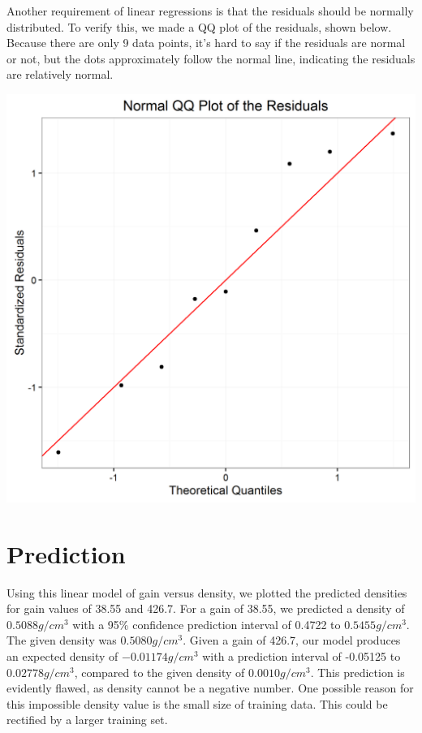 \documentclass[11pt]{article} %
\begin{document}
Another requirement of linear regressions is that the residuals should be normally distributed. To verify this, we made a QQ plot of the residuals, shown below. Because there are only 9 data points, it’s hard to say if the residuals are normal or not, but the dots approximately follow the normal line, indicating the residuals are relatively normal.
\begin{center}\includegraphics[scale=0.5]{qqPlotResiduals.png}\end{center}

\section*{Prediction}
Using this linear model of gain versus density, we plotted the predicted densities for gain values of 38.55 and 426.7. For a gain of 38.55, we predicted a density of $0.5088 g/cm^3$ with a 95\% confidence prediction interval of 0.4722 to $0.5455 g/cm^3$. The given density was $0.5080 g/cm^3$. Given a gain of 426.7, our model produces an expected density of $-0.01174 g/cm^3$ with a prediction interval of -0.05125 to $0.02778 g/cm^3$, compared to the given density of $0.0010 g/cm^3$. This prediction is evidently flawed, as density cannot be a negative number. One possible reason for this impossible density value is the small size of training data. This could be rectified by a larger training set.
\end{document}
